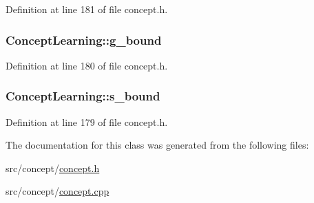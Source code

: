 Definition at line 181 of file concept.\-h.

\hypertarget{class_concept_learning_a449a58ac04e18fd981b2e6bf984fd764}{
\subsubsection[{g\-\_\-bound}]{ Concept\-Learning\-::g\-\_\-bound\hspace{0.3cm}{\ttfamily [private]}}}\label{class_concept_learning_a449a58ac04e18fd981b2e6bf984fd764}


Definition at line 180 of file concept.\-h.

\hypertarget{class_concept_learning_a8ac1de9ab4694d91cffabda42443a96e}{
\subsubsection[{s\-\_\-bound}]{ Concept\-Learning\-::s\-\_\-bound\hspace{0.3cm}{\ttfamily [private]}}}\label{class_concept_learning_a8ac1de9ab4694d91cffabda42443a96e}


Definition at line 179 of file concept.\-h.



The documentation for this class was generated from the following files\-:\begin{DoxyCompactItemize}
\item 
src/concept/\hyperlink{concept_8h}{concept.\-h}\item 
src/concept/\hyperlink{concept_8cpp}{concept.\-cpp}\end{DoxyCompactItemize}
